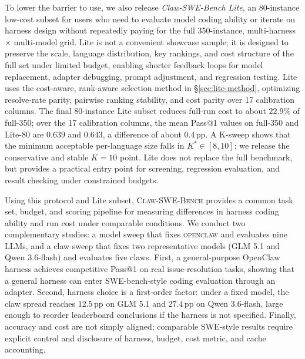 To lower the barrier to use, we also release \emph{Claw-SWE-Bench Lite}, an 80-instance low-cost subset for users who need to evaluate model coding ability or iterate on harness design without repeatedly paying for the full 350-instance, multi-harness $\times$ multi-model grid. Lite is not a convenient showcase sample; it is designed to preserve the scale, language distribution, key rankings, and cost structure of the full set under limited budget, enabling shorter feedback loops for model replacement, adapter debugging, prompt adjustment, and regression testing. Lite uses the cost-aware, rank-aware selection method in \S\ref{sec:lite-method}, optimizing resolve-rate parity, pairwise ranking stability, and cost parity over 17 calibration columns. The final 80-instance Lite subset reduces full-run cost to about $22.9\%$ of full-350; over the 17 calibration columns, the mean Pass@1 values on full-350 and Lite-80 are $0.639$ and $0.643$, a difference of about $0.4$\,pp. A K-sweep shows that the minimum acceptable per-language size falls in $K^*\in[8,10]$; we release the conservative and stable $K{=}10$ point. Lite does not replace the full benchmark, but provides a practical entry point for screening, regression evaluation, and result checking under constrained budgets.

Using this protocol and Lite subset, \textsc{Claw-SWE-Bench} provides a common task set, budget, and scoring pipeline for measuring differences in harness coding ability and run cost under comparable conditions. We conduct two complementary studies: a model sweep that fixes \textsc{openclaw} and evaluates nine LLMs, and a claw sweep that fixes two representative models (GLM 5.1 and Qwen 3.6-flash) and evaluates five claws. First, a general-purpose OpenClaw harness achieves competitive Pass@1 on real issue-resolution tasks, showing that a general harness can enter SWE-bench-style coding evaluation through an adapter. Second, harness choice is a first-order factor: under a fixed model, the claw spread reaches $12.5$\,pp on GLM 5.1 and $27.4$\,pp on Qwen 3.6-flash, large enough to reorder leaderboard conclusions if the harness is not specified. Finally, accuracy and cost are not simply aligned; comparable SWE-style results require explicit control and disclosure of harness, budget, cost metric, and cache accounting.
